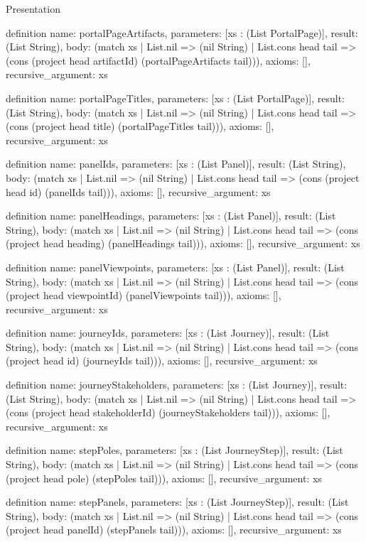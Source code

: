 \begin{lexlean}{Presentation}
\begin{semanticmodule}
definition{
  name: portalPageArtifacts,
  parameters: [xs : (List PortalPage)],
  result: (List String),
  body: (match xs
    | List.nil => (nil String)
    | List.cons head tail => (cons (project head artifactId) (portalPageArtifacts tail))),
  axioms: [],
  recursive_argument: xs
}

definition{
  name: portalPageTitles,
  parameters: [xs : (List PortalPage)],
  result: (List String),
  body: (match xs
    | List.nil => (nil String)
    | List.cons head tail => (cons (project head title) (portalPageTitles tail))),
  axioms: [],
  recursive_argument: xs
}

definition{
  name: panelIds,
  parameters: [xs : (List Panel)],
  result: (List String),
  body: (match xs
    | List.nil => (nil String)
    | List.cons head tail => (cons (project head id) (panelIds tail))),
  axioms: [],
  recursive_argument: xs
}

definition{
  name: panelHeadings,
  parameters: [xs : (List Panel)],
  result: (List String),
  body: (match xs
    | List.nil => (nil String)
    | List.cons head tail => (cons (project head heading) (panelHeadings tail))),
  axioms: [],
  recursive_argument: xs
}

definition{
  name: panelViewpoints,
  parameters: [xs : (List Panel)],
  result: (List String),
  body: (match xs
    | List.nil => (nil String)
    | List.cons head tail => (cons (project head viewpointId) (panelViewpoints tail))),
  axioms: [],
  recursive_argument: xs
}

definition{
  name: journeyIds,
  parameters: [xs : (List Journey)],
  result: (List String),
  body: (match xs
    | List.nil => (nil String)
    | List.cons head tail => (cons (project head id) (journeyIds tail))),
  axioms: [],
  recursive_argument: xs
}

definition{
  name: journeyStakeholders,
  parameters: [xs : (List Journey)],
  result: (List String),
  body: (match xs
    | List.nil => (nil String)
    | List.cons head tail => (cons (project head stakeholderId) (journeyStakeholders tail))),
  axioms: [],
  recursive_argument: xs
}

definition{
  name: stepPoles,
  parameters: [xs : (List JourneyStep)],
  result: (List String),
  body: (match xs
    | List.nil => (nil String)
    | List.cons head tail => (cons (project head pole) (stepPoles tail))),
  axioms: [],
  recursive_argument: xs
}

definition{
  name: stepPanels,
  parameters: [xs : (List JourneyStep)],
  result: (List String),
  body: (match xs
    | List.nil => (nil String)
    | List.cons head tail => (cons (project head panelId) (stepPanels tail))),
  axioms: [],
  recursive_argument: xs
}


\end{semanticmodule}
\end{lexlean}
